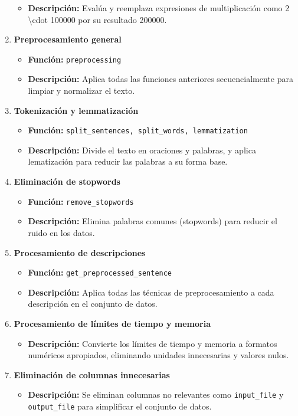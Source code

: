\documentclass{article}
\begin{document}
\begin{enumerate}
\begin{itemize}
            \item \textbf{Descripción:} Evalúa y reemplaza expresiones de multiplicación como 2 \textbackslash cdot 100000 por su resultado 200000.
        \end{itemize}
        \item \textbf{Preprocesamiento general}
        \begin{itemize}
            \item \textbf{Función:} \texttt{preprocessing}
            \item \textbf{Descripción:} Aplica todas las funciones anteriores secuencialmente para limpiar y normalizar el texto.
        \end{itemize}
        \item \textbf{Tokenización y lemmatización}
        \begin{itemize}
            \item \textbf{Función:} \texttt{split\_sentences, split\_words, lemmatization}
            \item \textbf{Descripción:} Divide el texto en oraciones y palabras, y aplica lematización para reducir las palabras a su forma base.
        \end{itemize}
        \item \textbf{Eliminación de stopwords}
        \begin{itemize}
            \item \textbf{Función:} \texttt{remove\_stopwords}
            \item \textbf{Descripción:} Elimina palabras comunes (stopwords) para reducir el ruido en los datos.
        \end{itemize}
        \item \textbf{Procesamiento de descripciones}
        \begin{itemize}
            \item \textbf{Función:} \texttt{get\_preprocessed\_sentence}
            \item \textbf{Descripción:} Aplica todas las técnicas de preprocesamiento a cada descripción en el conjunto de datos.
        \end{itemize}
        \item \textbf{Procesamiento de límites de tiempo y memoria}
        \begin{itemize}
            \item \textbf{Descripción:} Convierte los límites de tiempo y memoria a formatos numéricos apropiados, eliminando unidades innecesarias y valores nulos.
        \end{itemize}
        \item \textbf{Eliminación de columnas innecesarias}
        \begin{itemize}
            \item \textbf{Descripción:} Se eliminan columnas no relevantes como \texttt{input\_file} y \texttt{output\_file} para simplificar el conjunto de datos.
        \end{itemize}
    \end{enumerate}
\end{document}
